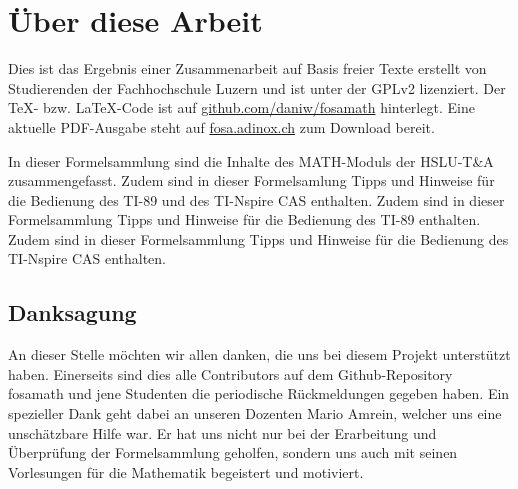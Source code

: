 



\chapter*{Über diese Arbeit}
Dies ist das Ergebnis einer Zusammenarbeit auf Basis freier Texte erstellt von 
Studierenden der Fachhochschule Luzern und ist unter der GPLv2 lizenziert. 
Der \TeX - bzw. \LaTeX -Code ist auf \url{github.com/daniw/fosamath} 
hinterlegt. Eine aktuelle PDF-Ausgabe steht auf \url{fosa.adinox.ch} zum 
Download bereit.

In dieser Formelsammlung sind die Inhalte des MATH-Moduls der HSLU-T\&A 
zusammengefasst.
%
\iftiboth
	Zudem sind in dieser Formelsamlung Tipps und Hinweise für die Bedienung 
    des TI-89 und des TI-Nspire CAS enthalten. 
	\else
	\ifti
		Zudem sind in dieser Formelsammlung Tipps und Hinweise für die 
        Bedienung des TI-89 enthalten. 
	\fi
	\ifnspire
		Zudem sind in dieser Formelsammlung Tipps und Hinweise für die 
        Bedienung des TI-Nspire CAS enthalten. 
	\fi
\fi




\section*{Danksagung}
An dieser Stelle möchten wir allen danken, die uns bei diesem Projekt 
unterstützt haben.
Einerseits sind dies alle Contributors auf dem Github-Repository fosamath und 
jene Studenten die periodische Rückmeldungen gegeben haben.
Ein spezieller Dank geht dabei an unseren Dozenten Mario Amrein, welcher uns 
eine unschätzbare Hilfe war.
Er hat uns nicht nur bei der Erarbeitung und Überprüfung der Formelsammlung 
geholfen, sondern uns auch mit seinen Vorlesungen für die Mathematik begeistert 
und motiviert.


